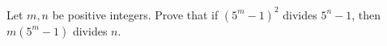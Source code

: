 Let $m,n$ be positive integers. Prove that if $(5^m-1)^2$ divides $5^n-1$, then $m(5^m-1)$ divides $n$.
